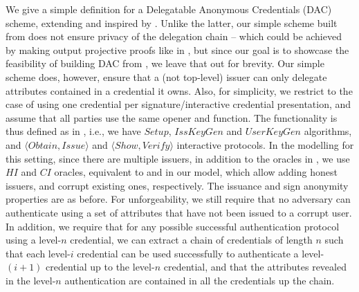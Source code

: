 We give a simple definition for a Delegatable Anonymous Credentials (DAC)
scheme, extending \cite{fhs19} and inspired by \cite{bcc+09}. Unlike the latter,
our simple scheme built from \CUASGen does not ensure privacy of the delegation
chain -- which could be achieved by making \feval output projective proofs like
in \cite{bcc+09}, but since our goal is to showcase the feasibility of building
DAC from \UAS, we leave that out for brevity. Our simple scheme does, however,
ensure that a (not top-level) issuer can only delegate attributes contained in a
credential it owns. Also, for simplicity, we restrict to the case of using one
credential per signature/interactive credential presentation, and assume that
all parties use the same opener and \finsp function.
%
The functionality is thus defined as in , i.e.,
we have $Setup$, $IssKeyGen$ and $UserKeyGen$ algorithms, and $\langle Obtain,
Issue \rangle$ and $\langle Show,Verify \rangle$ interactive protocols.
%
In the modelling for this setting, since there are multiple issuers, in addition
to the oracles in , we use $HI$ and $CI$ oracles,
equivalent to \IGEN and \ICORR in our \UAS model, which allow adding honest
issuers, and corrupt existing ones, respectively. The issuance and sign
anonymity properties are as before. For unforgeability, we still require
that no adversary can authenticate using a set of attributes that have not been
issued to a corrupt user. In addition, we require that for any possible
successful authentication protocol using a level-$n$ credential, we can extract
a chain of credentials of length $n$ such that each level-$i$ credential can
be used successfully to authenticate a level-$(i+1)$ credential up to the
level-$n$ credential, and that the attributes revealed in the level-$n$
authentication are contained in all the credentials up the chain.

